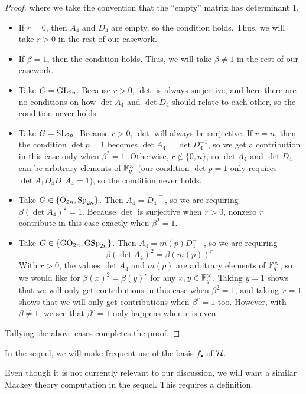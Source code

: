 \begin{proof}
    where we take the convention that the ``empty'' matrix has determinant $1$. %
    \begin{itemize}
        \item If $r=0$, then $A_4$ and $D_4$ are empty, so the condition holds. Thus, we will take $r>0$ in the rest of our casework.
        \item If $\beta=1$, then the condition holds. Thus, we will take $\beta\ne1$ in the rest of our casework.
        \item Take $G=\mathrm{GL}_{2n}$. Because $r>0$, $\det$ is always surjective, and here there are no conditions on how $\det A_4$ and $\det D_4$ should relate to each other, so the condition never holds.
        \item Take $G=\mathrm{SL}_{2n}$. Because $r>0$, $\det$ will always be surjective. If $r=n$, then the condition $\det p=1$ becomes $\det A_4=\det D_4^{-1}$, so we get a contribution in this case only when $\beta^2=1$. Otherwise, $r\notin\{0,n\}$, so $\det A_4$ and $\det D_4$ can be arbitrary elements of $\mathbb F_q^\times$ (our condition $\det p=1$ only requires $\det A_1D_4D_1A_4=1$), so the condition never holds.
        \item Take $G\in\{\mathrm{O}_{2n},\mathrm{Sp}_{2n}\}$. Then $A_4=D_4^{-\intercal}$, so we are requiring $\beta(\det A_4)^2=1$. Because $\det$ is surjective when $r>0$, nonzero $r$ contribute in this case exactly when $\beta^2=1$.
        \item Take $G\in\{\mathrm{GO}_{2n},\mathrm{GSp}_{2n}\}$. Then $A_4=m(p)D_4^{-\intercal}$, so we are requiring
        \[\beta(\det A_4)^2=\beta(m(p))^r.\]
        With $r>0$, the values $\det A_4$ and $m(p)$ are arbitrary elements of $\mathbb F_q^\times$, so we would like for $\beta(x)^2=\beta(y)^r$ for any $x,y\in\mathbb F_q^\times$. Taking $y=1$ shows that we will only get contributions in this case when $\beta^2=1$, and taking $x=1$ shows that we will only get contributions when $\beta^r=1$ too. However, with $\beta\ne1$, we see that $\beta^r=1$ only happens when $r$ is even.
    \end{itemize}
    Tallying the above cases completes the proof.
\end{proof}
\begin{remark}
    In the sequel, we will make frequent use of the basis $f_\bullet$ of $\mathcal{H}$.
\end{remark}
Even though it is not currently relevant to our discussion, we will want a similar Mackey theory computation in the sequel. This requires a definition.
